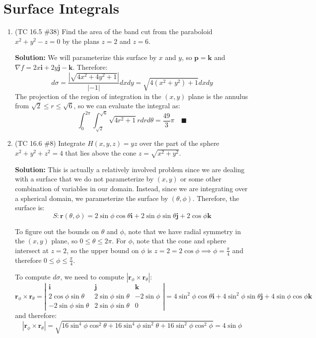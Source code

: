 \documentclass[letterpaper, 11pt]{article}
\begin{document}
\section{Surface Integrals}
\begin{enumerate}
\item (TC 16.5 \#38) Find the area of the band cut from the paraboloid $x^2 + y^2 - z = 0$ by the plans $z = 2$ and $z = 6$. 

\par \textbf{Solution:} We will parameterize this surface by $x$ and $y$, so $\bm{p} = \bm{k}$ and $\nabla f = 2x \bm{i} + 2y \bm{j} - \bm{k}$. Therefore:
\[ d \sigma = \frac{ |\sqrt{4x^2 + 4y^2 + 1}|}{ |-1|} dxdy = \sqrt{4(x^2 + y^2) + 1}dx dy \]
The projection of the region of integration in the $(x,y)$ plane is the annulus from $ \sqrt{2} \leq r \leq \sqrt{6}$, so we can evaluate the integral as:
\[ \int_0^{2 \pi} \int_{\sqrt{2}}^{\sqrt{6}} \sqrt{ 4r^2 + 1} r dr d\theta = \frac{49}{3} \pi \quad\blacksquare \]

\item (TC 16.6 \#8) Integrate $H(x,y,z) = yz$ over the part of the sphere $x^2 + y^2 + z^2 = 4$ that lies above the cone $z = \sqrt{x^2 + y^2}$. 

\par \textbf{Solution:} This is actually a relatively involved problem since we are dealing with a surface that we do not parameterize by $(x,y)$ or some other combination of variables in our domain. Instead, since we are integrating over a spherical domain, we parameterize the surface by $(\theta,\phi)$. Therefore, the surface is:
\[ S: \bm{r}(\theta,\phi) = 2 \sin \phi\cos \theta \bm{i} + 2 \sin \phi \sin \theta \bm{j} + 2 \cos \phi \bm{k} \]

To figure out the bounds on $\theta$ and $\phi$, note that we have radial symmetry in the $(x,y)$ plane, so $0 \leq \theta \leq 2\pi$. For $\phi$, note that the cone and sphere intersect at $z = 2$, so the upper bound on $\phi$ is $z = 2 = 2 \cos \phi \implies \phi = \frac{\pi}{4}$ and therefore $0 \leq \phi \leq \frac{\pi}{4}$.
\par To compute $d \sigma$, we need to compute $|\bm{r}_\phi \times \bm{r}_\theta|$:
\[ \bm{r}_\phi \times \bm{r}_\theta =\left| \begin{array}{ccc} \bm{i} & \bm{j} & \bm{k}\\ 2 \cos \phi \sin \theta & 2 \sin \phi \sin \theta & - 2 \sin \phi	 \\ -2 \sin \phi \sin \theta & 2 \sin \phi \sin \theta & 0 \end{array} \right| = 4\sin^2 \phi \cos \theta \bm{i} + 4 \sin^2 \phi \sin \theta \bm{j} + 4 \sin \phi \cos \phi \bm{k}  \]
and therefore:
\[ | \bm{r}_\phi \times \bm{r}_\theta| = \sqrt{ 16 \sin^4 \phi \cos^2 \theta + 16 \sin^4 \phi \sin^2 \theta  + 16 \sin^2 \phi \cos^2 \phi } = 4 \sin \phi \]


\end{enumerate}
\end{document}
